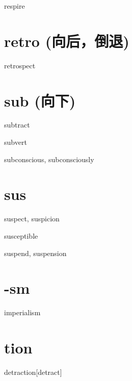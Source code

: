 \begin{wordRef}{respire}
\end{wordRef}

\section{retro (向后，倒退)}
\begin{wordRef}{retrospect}
\end{wordRef}


\section{sub (向下)}

\begin{wordRef}{subtract}
\end{wordRef}

\begin{wordRef}{subvert}
\end{wordRef}

\begin{wordRef}{subconscious, subconsciously}
\end{wordRef}

\section{sus}

\begin{wordRef}{suspect, suspicion}
\end{wordRef}

\begin{wordRef}{susceptible}
\end{wordRef}

\begin{wordRef}{suspend, suspension}
\end{wordRef}

\section{-sm}

\begin{wordRef}{imperialism}
\end{wordRef}

\section{tion}

\begin{wordRef}{detraction}[detract]
\end{wordRef}


